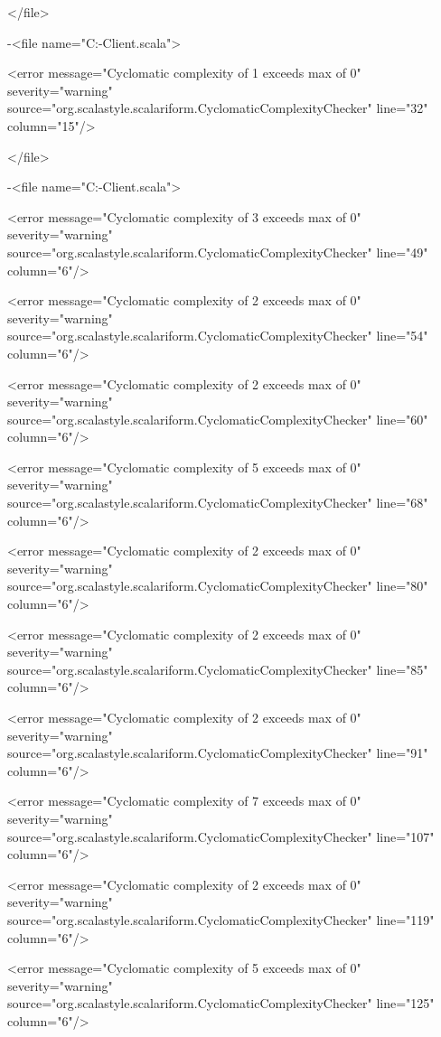 \documentclass{scalatekids-article}
\begin{document}
</file>


-<file name="C:\Users\Davide\Documents\GitHub\Actorbase-Client\src\main\scala\com\actorbase\cli\models\ExportCommand.scala">

<error message="Cyclomatic complexity of 1 exceeds max of 0" severity="warning" source="org.scalastyle.scalariform.CyclomaticComplexityChecker" line="32" column="15"/>

</file>


-<file name="C:\Users\Davide\Documents\GitHub\Actorbase-Client\src\main\scala\com\actorbase\cli\controllers\GrammarParser.scala">

<error message="Cyclomatic complexity of 3 exceeds max of 0" severity="warning" source="org.scalastyle.scalariform.CyclomaticComplexityChecker" line="49" column="6"/>

<error message="Cyclomatic complexity of 2 exceeds max of 0" severity="warning" source="org.scalastyle.scalariform.CyclomaticComplexityChecker" line="54" column="6"/>

<error message="Cyclomatic complexity of 2 exceeds max of 0" severity="warning" source="org.scalastyle.scalariform.CyclomaticComplexityChecker" line="60" column="6"/>

<error message="Cyclomatic complexity of 5 exceeds max of 0" severity="warning" source="org.scalastyle.scalariform.CyclomaticComplexityChecker" line="68" column="6"/>

<error message="Cyclomatic complexity of 2 exceeds max of 0" severity="warning" source="org.scalastyle.scalariform.CyclomaticComplexityChecker" line="80" column="6"/>

<error message="Cyclomatic complexity of 2 exceeds max of 0" severity="warning" source="org.scalastyle.scalariform.CyclomaticComplexityChecker" line="85" column="6"/>

<error message="Cyclomatic complexity of 2 exceeds max of 0" severity="warning" source="org.scalastyle.scalariform.CyclomaticComplexityChecker" line="91" column="6"/>

<error message="Cyclomatic complexity of 7 exceeds max of 0" severity="warning" source="org.scalastyle.scalariform.CyclomaticComplexityChecker" line="107" column="6"/>

<error message="Cyclomatic complexity of 2 exceeds max of 0" severity="warning" source="org.scalastyle.scalariform.CyclomaticComplexityChecker" line="119" column="6"/>

<error message="Cyclomatic complexity of 5 exceeds max of 0" severity="warning" source="org.scalastyle.scalariform.CyclomaticComplexityChecker" line="125" column="6"/>
\end{document}
